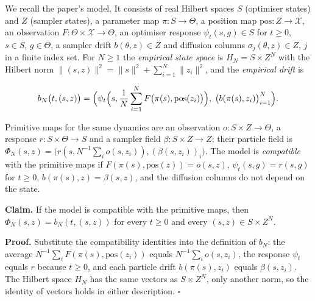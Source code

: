 \documentclass[11pt,a4paper]{report}
\begin{document}
We recall the paper's model. It consists of real Hilbert spaces \(S\) (optimiser states) and \(Z\) (sampler states), a parameter map \(\pi:S\to\Theta\), a position map \(\mathrm{pos}:Z\to\mathcal X\), an observation \(F:\Theta\times\mathcal X\to\Theta\), an optimiser response \(\psi_t(s,g)\in S\) for \(t\ge0\), \(s\in S\), \(g\in\Theta\), a sampler drift \(b(\theta,z)\in Z\) and diffusion columns \(\sigma_j(\theta,z)\in Z\), \(j\) in a finite index set. For \(N\ge1\) the \emph{empirical state space} is \(H_N=S\times Z^N\) with the Hilbert norm \(\|(s,z)\|^2=\|s\|^2+\sum_{i=1}^N\|z_i\|^2\), and the \emph{empirical drift} is


\[b_N\bigl(t,(s,z)\bigr)=\Bigl(\psi_t\Bigl(s,\frac1N\sum_{i=1}^NF\bigl(\pi(s),\mathrm{pos}(z_i)\bigr)\Bigr),\;\bigl(b(\pi(s),z_i)\bigr)_{i=1}^N\Bigr).\]


Primitive maps for the same dynamics are an observation \(o:S\times Z\to\Theta\), a response \(r:S\times\Theta\to S\) and a sampler field \(\beta:S\times Z\to Z\); their particle field is \(\Phi_N(s,z)=\bigl(r(s,N^{-1}\sum_io(s,z_i)),(\beta(s,z_i))_i\bigr)\). The model is \emph{compatible} with the primitive maps if \(F(\pi(s),\mathrm{pos}(z))=o(s,z)\), \(\psi_t(s,g)=r(s,g)\) for \(t\ge0\), \(b(\pi(s),z)=\beta(s,z)\), and the diffusion columns do not depend on the state.




\textbf{Claim.} If the model is compatible with the primitive maps, then \(\Phi_N(s,z)=b_N(t,(s,z))\) for every \(t\ge0\) and every \((s,z)\in S\times Z^N\).




\textbf{Proof.} Substitute the compatibility identities into the definition of \(b_N\): the average \(N^{-1}\sum_iF(\pi(s),\mathrm{pos}(z_i))\) equals \(N^{-1}\sum_io(s,z_i)\), the response \(\psi_t\) equals \(r\) because \(t\ge0\), and each particle drift \(b(\pi(s),z_i)\) equals \(\beta(s,z_i)\). The Hilbert space \(H_N\) has the same vectors as \(S\times Z^N\), only another norm, so the identity of vectors holds in either description. \(\square\)
\end{document}
